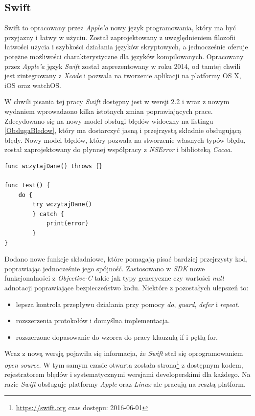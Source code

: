 \documentclass{iiuwb}
\begin{document}
\subsection{Swift}
Swift \cite{Lassoff:2014:Swift} to opracowany przez \textit{Apple'a} nowy język programowania, który ma być przyjazny i łatwy w użyciu. Został zaprojektowany z uwzględnieniem filozofii łatwości użycia i szybkości działania języków skryptowych, a jednocześnie oferuje potężne możliwości charakterystyczne dla języków kompilowanych.	 Opracowany przez \textit{Apple'a} język \textit{Swift} został zaprezentowany w roku 2014, od tamtej chwili jest zintegrowany z \textit{Xcode} i pozwala na tworzenie aplikacji na platformy OS X, iOS oraz watchOS. 

W chwili pisania tej pracy \textit{Swift} dostępny jest w wersji 2.2 i wraz z nowym wydaniem wprowadzono kilka istotnych zmian poprawiających prace. Zdecydowano się na nowy model obsługi błędów widoczny na listingu \ref{ObslugaBledow}, który ma dostarczyć jasną i przejrzystą składnie obsługującą błędy. Nowy model błędów, który pozwala na stworzenie własnych typów błędu, został zaprojektowany do płynnej współpracy z \textit{NSError} i biblioteką \textit{Cocoa}.
\begin{lstlisting}[label=ObslugaBledow, caption=Nowy model obsługi błedów w Swift]
func wczytajDane() throws {}

func test() {
	do {
		try wczytajDane()
		} catch {
			print(error)
		}
}
\end{lstlisting}
Dodano nowe funkcje składniowe, które pomagają pisać bardziej przejrzysty kod, poprawiając jednocześnie jego spójność. Zastosowano w \textit{SDK} nowe funkcjonalności z \textit{Objective-C} takie jak typy generyczne czy wartości \textit{null} adnotacji poprawiające bezpieczeństwo kodu. Niektóre z pozostałych ulepszeń to:
\begin{itemize}
\item lepsza kontrola przepływu działania przy pomocy \textit{do}, \textit{guard}, \textit{defer} i \textit{repeat}.    
\item rozszerzenia protokołów i domyślna implementacja.
\item rozszerzone dopasowanie do wzorca do pracy klauzulą if i pętlą for.
\end{itemize}
Wraz z nową wersją pojawiła się informacja, że \textit{Swift} stał się oprogramowaniem \textit{open source}. W tym samym czasie otwarta została strona\footnote{\url{https://swift.org} czas dostępu: 2016-06-01} z dostępnym kodem, rejestratorem błędów i systematycznymi wersjami developerskimi dla każdego. Na razie \textit{Swift} obsługuje platformy \textit{Apple} oraz \textit{Linux} ale pracują na resztą platform.
\end{document}
